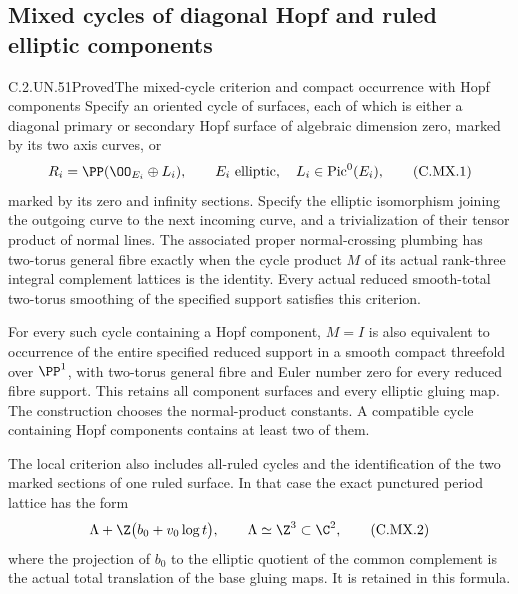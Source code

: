 \subsection{Mixed cycles of diagonal Hopf and ruled elliptic components}

\begin{statement}{C.2.UN.51}{Proved}{The mixed-cycle criterion and compact occurrence with Hopf components}
Specify an oriented cycle of surfaces, each of which is either
a diagonal primary or secondary Hopf surface of algebraic dimension
zero, marked by its two axis curves, or
\[
                  R_i=\PP(\OO_{E_i}\oplus L_i),
                  \qquad E_i\ \hbox{elliptic},\quad
                         L_i\in\operatorname{Pic}^0(E_i),
                                                        \tag{C.MX.1}
\]
marked by its zero and infinity sections. Specify the elliptic
isomorphism joining the outgoing curve to the next incoming curve,
and a trivialization of their tensor product of normal lines.
The associated proper normal-crossing plumbing has two-torus
general fibre exactly when the cycle product $M$ of its actual
rank-three integral complement lattices is the identity.
Every actual reduced smooth-total two-torus smoothing of the
specified support satisfies this criterion.

For every such cycle containing a Hopf component, $M=I$ is also
equivalent to occurrence of the entire specified reduced support
in a smooth compact threefold over $\PP^1$, with two-torus
general fibre and Euler number zero for every reduced fibre
support. This retains all component surfaces and every elliptic
gluing map. The construction chooses the normal-product constants.
A compatible cycle containing Hopf components contains at least
two of them.

The local criterion also includes all-ruled cycles and the
identification of the two marked sections of one ruled surface.
In that case the exact punctured period lattice has the form
\[
                 \Lambda+\Z\bigl(b_0+v_0\log t\bigr),
           \qquad \Lambda\simeq\Z^3\subset\C^2,          \tag{C.MX.2}
\]
where the projection of $b_0$ to the elliptic quotient of the
common complement is the actual total translation of the base
gluing maps. It is retained in this formula.
\end{statement}

